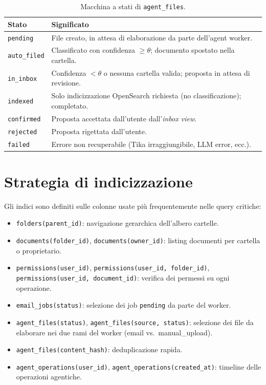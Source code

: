 \begin{table}[ht]
\centering
\small
\begin{tabularx}{\linewidth}{l X}
\toprule
\textbf{Stato} & \textbf{Significato} \\
\midrule
\texttt{pending}      & File creato, in attesa di elaborazione da parte dell'agent worker. \\
\texttt{auto\_filed}  & Classificato con confidenza $\geq \theta$; documento spostato nella cartella. \\
\texttt{in\_inbox}    & Confidenza $< \theta$ o nessuna cartella valida; proposta in attesa di revisione. \\
\texttt{indexed}      & Solo indicizzazione OpenSearch richiesta (no classificazione); completato. \\
\texttt{confirmed}    & Proposta accettata dall'utente dall'\emph{inbox view}. \\
\texttt{rejected}     & Proposta rigettata dall'utente. \\
\texttt{failed}       & Errore non recuperabile (Tika irraggiungibile, LLM error, ecc.). \\
\bottomrule
\end{tabularx}
\caption{Macchina a stati di \texttt{agent\_files}.}
\label{tab:state_machine_files}
\end{table}

\section{Strategia di indicizzazione}
\label{sec:indexing}

Gli indici sono definiti sulle colonne usate pi\`u frequentemente nelle query critiche:

\begin{itemize}[leftmargin=*]
    \item \texttt{folders(parent\_id)}: navigazione gerarchica dell'albero cartelle.
    \item \texttt{documents(folder\_id)}, \texttt{documents(owner\_id)}: listing documenti per cartella o proprietario.
    \item \texttt{permissions(user\_id)}, \texttt{permissions(user\_id, folder\_id)},
          \texttt{permissions(user\_id, document\_id)}: verifica dei permessi su ogni operazione.
    \item \texttt{email\_jobs(status)}: selezione dei job \texttt{pending} da parte del worker.
    \item \texttt{agent\_files(status)}, \texttt{agent\_files(source, status)}: selezione dei
          file da elaborare nei due rami del worker (email vs.\ manual\_upload).
    \item \texttt{agent\_files(content\_hash)}: deduplicazione rapida.
    \item \texttt{agent\_operations(user\_id)}, \texttt{agent\_operations(created\_at)}:
          timeline delle operazioni agentiche.
\end{itemize}

